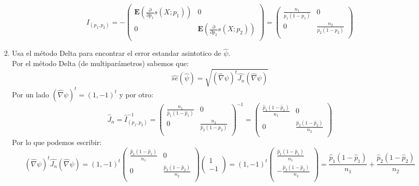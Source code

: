 \documentclass[letter]{memoir} %
\begin{document}
\begin{enumerate}
\begin{enumerate}
\[
I_{(p_1,p_2)} = -
	\begin{pmatrix}
		\mathbf{E} \left( \frac{\partial  }{\partial p_1} s(X;p_1) \right) &  0\\
        0 & \mathbf{E} \left( \frac{\partial  }{\partial p_2 } s(X;p_2) \right)\\
	\end{pmatrix} = 
\begin{pmatrix}
		\frac{n_1}{p_1(1-p_1)} &  0\\
        0 & \frac{n_2}{p_2(1-p_2)}\\
	\end{pmatrix}    
\]

\item Usa el método Delta para encontrar el error estandar asintotico de $\hat{\psi}$.\\
Por el método Delta (de multiparámetros) sabemos que:\\
\[
\hat{se}(\hat{\psi}) = \sqrt{ (\hat{\nabla } \psi)^t \hat{J_n}(\hat{\nabla } \psi)}
\]
Por un lado $(\hat{\nabla } \psi)^t =  (1,-1)^t$ y por otro:
\[
\hat{J}_n=\hat{I}_{(p_1,p_2)}^{-1} = \begin{pmatrix}
		\frac{n_1}{\hat{p}_1(1-\hat{p}_1)} &  0\\
        0 & \frac{n_2}{\hat{p}_2(1-\hat{p}_2)}\\
	\end{pmatrix}^{-1} = \begin{pmatrix}
		\frac{\hat{p}_1(1-\hat{p}_1)}{n_1} &  0\\
        0 & \frac{\hat{p}_2(1-\hat{p}_2)}{n_2}\\
	\end{pmatrix}
\]
Por lo que podemos escribir:
\[(\hat{\nabla } \psi)^t \hat{J_n}(\hat{\nabla } \psi) = (1,-1)^t
 \begin{pmatrix}
		\frac{\hat{p}_1(1-\hat{p}_1)}{n_1} &  0\\
        0 & \frac{\hat{p}_2(1-\hat{p}_2)}{n_2}\\
	\end{pmatrix} \begin{pmatrix} 1 \\-1	\end{pmatrix} =  (1,-1)^t
 \begin{pmatrix}
		\frac{\hat{p}_1(1-\hat{p}_1)}{n_1} \\
        - \frac{\hat{p}_2(1-\hat{p}_2)}{n_2}\\
	\end{pmatrix} = \frac{\hat{p}_1(1-\hat{p}_1)}{n_1} 
        + \frac{\hat{p}_2(1-\hat{p}_2)}{n_2}
\]
\end{enumerate}
\end{enumerate}
\end{document}
